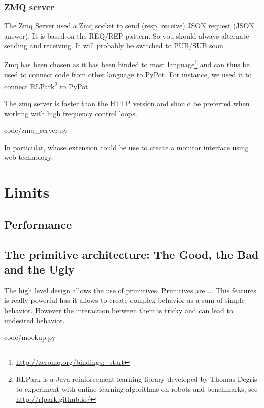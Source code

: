 \subsubsection{ZMQ server} %

The Zmq Server used a Zmq socket to send (resp. receive) JSON request (JSON answer). It is based on the REQ/REP pattern. So you should always alternate sending and receiving. It will probably be switched to PUB/SUB soon.

Zmq has been chosen as it has been binded to most language\footnote{\url{http://zeromq.org/bindings:_start}} and can thus be used to connect code from other language to PyPot. For instance, we used it to connect RLPark\footnote{RLPark is a Java reinforcement learning library developed by Thomas Degris to experiment with online learning algorithms on robots and benchmarks, see \url{http://rlpark.github.io/}} to PyPot.

The zmq server is faster than the HTTP version and should be preferred when working with high frequency control loops.


    {code/zmq_server.py}


In particular, whose extension could be use to create a monitor interface using web technology.






\section{Limits} %


\subsection{Performance} %

\subsection{The primitive architecture: The Good, the Bad and the Ugly} %
The high level design allows the use of primitives.
Primitives are ...
This features is really powerful has it allows to create complex behavior as a sum of simple behavior.
However the interaction between them is tricky and can lead to undesired behavior.



    {code/mockup.py}




